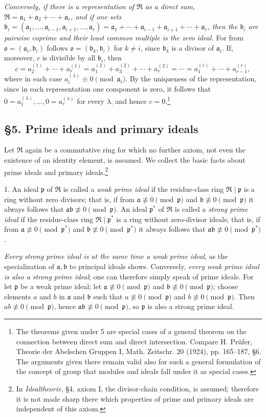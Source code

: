 \documentclass[11pt]{article}
\providecommand{\mR}{\mathfrak{R}}
\providecommand{\ma}{\mathfrak{a}}
\providecommand{\mb}{\mathfrak{b}}
\providecommand{\mo}{\mathfrak{o}}
\providecommand{\mpideal}{\mathfrak{p}}
\begin{document}
\emph{Conversely, if there is a representation of $\mR$ as a direct sum, $\mR=\ma_1+\ma_2+\cdots+\ma_r$, and if one sets $\mb_i=(\ma_1,
\ldots,\ma_{i-1},\ma_{i+1},\ldots,\ma_r)=\ma_1+\cdots+\ma_{i-1}+\ma_{i+1}+\cdots+\ma_r$, then the $\mb_i$ are pairwise coprime and their least common multiple is the zero ideal.} For from $\mo=(\ma_i,\mb_i)$ follows $\mo=(\mb_k,\mb_i)$ for $k\ne i$, since $\mb_k$ is a divisor of $\ma_i$. If, moreover, $c$ is divisible by all $\mb_i$, then
\[
 c=a_2^{(1)}+\cdots+a_r^{(1)}=a_1^{(2)}+a_3^{(2)}+\cdots+a_r^{(2)}=\cdots=a_1^{(r)}+\cdots+a_{r-1}^{(r)},
\]
where in each case $a_i^{(\lambda)}\equiv0\pmod{\ma_i}$. By the uniqueness of the representation, since in each representation one component is zero, it follows that $0=a_1^{(\lambda)},
\ldots,0=a_r^{(\lambda)}$ for every $\lambda$, and hence $c=0$.\footnote{The theorems given under 5 are special cases of a general theorem on the connection between direct sum and direct intersection. Compare H. Prüfer, Theorie der Abelschen Gruppen I, Math. Zeitschr. 20 (1924), pp. 165--187, §6. The arguments given there remain valid also for such a general formulation of the concept of group that modules and ideals fall under it as special cases.}

\subsection*{§5. Prime ideals and primary ideals}

Let $\mR$ again be a commutative ring for which no further axiom, not even the existence of an identity element, is assumed. We collect the basic facts about prime ideals and primary ideals.\footnote{In \emph{Idealtheorie}, §4, axiom I, the divisor-chain condition, is assumed; therefore it is not made sharp there which properties of prime and primary ideals are independent of this axiom.}

1. An ideal $\mpideal$ of $\mR$ is called a \emph{weak prime ideal} if the residue-class ring $\mR\mid\mpideal$ is a ring without zero divisors; that is, if from $\ma\not\equiv0\pmod{\mpideal}$ and $\mb\not\equiv0\pmod{\mpideal}$ it always follows that $\ma\mb\not\equiv0\pmod{\mpideal}$. An ideal $\mpideal^*$ of $\mR$ is called a \emph{strong prime ideal} if the residue-class ring $\mR\mid\mpideal^*$ is a ring without zero-divisor ideals; that is, if from $\ma\not\equiv0\pmod{\mpideal^*}$ and $\mb\not\equiv0\pmod{\mpideal^*}$ it always follows that $\ma\mb\not\equiv0\pmod{\mpideal^*}$.

\emph{Every strong prime ideal is at the same time a weak prime ideal}, as the specialization of $\ma,\mb$ to principal ideals shows. Conversely, \emph{every weak prime ideal is also a strong prime ideal}; one can therefore simply speak of prime ideals. For let $\mpideal$ be a weak prime ideal; let $\ma\not\equiv0\pmod{\mpideal}$ and $\mb\not\equiv0\pmod{\mpideal}$; choose elements $a$ and $b$ in $\ma$ and $\mb$ such that $a\not\equiv0\pmod{\mpideal}$ and $b\not\equiv0\pmod{\mpideal}$. Then $ab\not\equiv0\pmod{\mpideal}$, hence $\ma\mb\not\equiv0\pmod{\mpideal}$, so $\mpideal$ is also a strong prime ideal.
\end{document}
